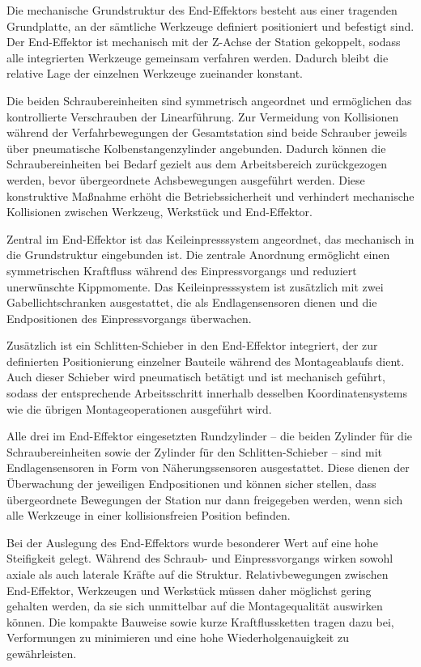 Die mechanische Grundstruktur des End-Effektors besteht aus einer tragenden Grundplatte, an der sämtliche Werkzeuge definiert positioniert und befestigt sind. Der End-Effektor ist mechanisch mit der Z-Achse der Station gekoppelt, sodass alle integrierten Werkzeuge gemeinsam verfahren werden. Dadurch bleibt die relative Lage der einzelnen Werkzeuge zueinander konstant.

Die beiden Schraubereinheiten sind symmetrisch angeordnet und ermöglichen das kontrollierte Verschrauben der Linearführung. Zur Vermeidung von Kollisionen während der Verfahrbewegungen der Gesamtstation sind beide Schrauber jeweils über pneumatische Kolbenstangenzylinder angebunden. Dadurch können die Schraubereinheiten bei Bedarf gezielt aus dem Arbeitsbereich zurückgezogen werden, bevor übergeordnete Achsbewegungen ausgeführt werden. Diese konstruktive Maßnahme erhöht die Betriebssicherheit und verhindert mechanische Kollisionen zwischen Werkzeug, Werkstück und End-Effektor.

Zentral im End-Effektor ist das Keileinpresssystem angeordnet, das mechanisch in die Grundstruktur eingebunden ist. Die zentrale Anordnung ermöglicht einen symmetrischen Kraftfluss während des Einpressvorgangs und reduziert unerwünschte Kippmomente. Das Keileinpresssystem ist zusätzlich mit zwei Gabellichtschranken ausgestattet, die als Endlagensensoren dienen und die Endpositionen des Einpressvorgangs überwachen.

Zusätzlich ist ein Schlitten-Schieber in den End-Effektor integriert, der zur definierten Positionierung einzelner Bauteile während des Montageablaufs dient. Auch dieser Schieber wird pneumatisch betätigt und ist mechanisch geführt, sodass der entsprechende Arbeitsschritt innerhalb desselben Koordinatensystems wie die übrigen Montageoperationen ausgeführt wird.

Alle drei im End-Effektor eingesetzten Rundzylinder – die beiden Zylinder für die Schraubereinheiten sowie der Zylinder für den Schlitten-Schieber – sind mit Endlagensensoren in Form von Näherungssensoren ausgestattet. Diese dienen der Überwachung der jeweiligen Endpositionen und können sicher stellen, dass übergeordnete Bewegungen der Station nur dann freigegeben werden, wenn sich alle Werkzeuge in einer kollisionsfreien Position befinden.

Bei der Auslegung des End-Effektors wurde besonderer Wert auf eine hohe Steifigkeit gelegt. Während des Schraub- und Einpressvorgangs wirken sowohl axiale als auch laterale Kräfte auf die Struktur. Relativbewegungen zwischen End-Effektor, Werkzeugen und Werkstück müssen daher möglichst gering gehalten werden, da sie sich unmittelbar auf die Montagequalität auswirken können. Die kompakte Bauweise sowie kurze Kraftflussketten tragen dazu bei, Verformungen zu minimieren und eine hohe Wiederholgenauigkeit zu gewährleisten.

